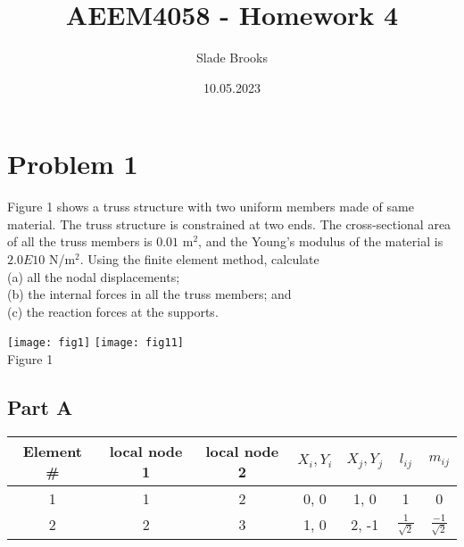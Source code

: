 \documentclass{article}
\title{AEEM4058 - Homework 4}
\author{Slade Brooks}
\date{10.05.2023}
\begin{document}
\maketitle

\section*{Problem 1}
Figure 1 shows a truss structure with two uniform members made of same material.
The truss structure is constrained at two ends. The cross-sectional area of all the
truss members is $0.01$ m$^2$, and the Young’s modulus of
the material is $2.0E10$ N/m$^2$. Using the finite element method, calculate \\
(a) all the nodal displacements; \\
(b) the internal forces in all the truss members; and \\
(c) the reaction forces at the supports.
\begin{center}
    \texttt{[image: fig1]} \texttt{[image: fig11]} \\
    Figure 1
\end{center}
\subsection*{Part A}
\begin{tabular}{|c|c|c|c|c|c|c|}
    \hline
    Element \# & local node 1 & local node 2 & $X_i, Y_i$ & $X_j, Y_j$ & $l_{ij}$ & $m_{ij}$ \\
    \hline
    1 & 1 & 2 & 0, 0 & 1, 0 & 1 & 0 \\
    2 & 2 & 3 & 1, 0 & 2, -1 & $\frac{1}{\sqrt{2}}$ & $\frac{-1}{\sqrt{2}}$ \\
    \hline
\end{tabular}
\end{document}

